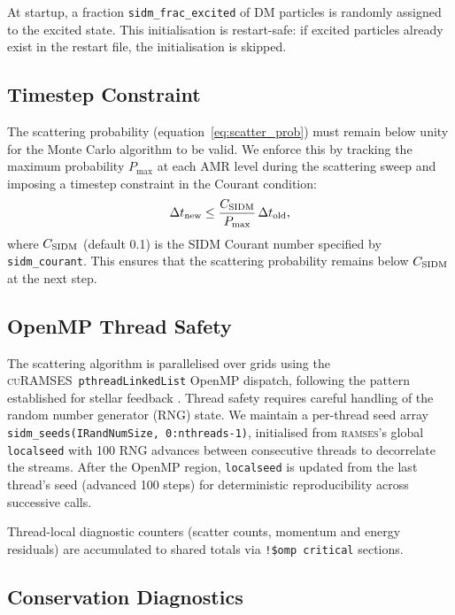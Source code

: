 \documentclass[fleqn,usenatbib]{mnras}
\newcommand{\ramses}{\textsc{ramses}}
\newcommand{\curamses}{\textsc{cuRAMSES}}
\newcommand{\code}[1]{\texttt{#1}}
\begin{document}
At startup, a fraction \code{sidm\_frac\_excited} of DM particles is
randomly assigned to the excited state.  This initialisation is
restart-safe: if excited particles already exist in the restart file,
the initialisation is skipped.

\subsection{Timestep Constraint}
\label{sec:sidm_timestep}

The scattering probability (equation~\ref{eq:scatter_prob}) must
remain below unity for the Monte Carlo algorithm to be valid.  We
enforce this by tracking the maximum probability $P_{\max}$ at each
AMR level during the scattering sweep and imposing a timestep
constraint in the Courant condition:
\begin{equation}
\Delta t_{\rm new} \le \frac{C_{\rm SIDM}}{P_{\max}}\,\Delta t_{\rm old},
\label{eq:sidm_dt}
\end{equation}
where $C_{\rm SIDM}$ (default 0.1) is the SIDM Courant number
specified by \code{sidm\_courant}.  This ensures that the scattering
probability remains below $C_{\rm SIDM}$ at the next step.

\subsection{OpenMP Thread Safety}
\label{sec:sidm_omp}

The scattering algorithm is parallelised over grids using the
\curamses\ \code{pthreadLinkedList} OpenMP dispatch, following the
pattern established for stellar feedback \citep{Kim2026}.  Thread
safety requires careful handling of the random number generator (RNG)
state.  We maintain a per-thread seed array
\code{sidm\_seeds(IRandNumSize, 0:nthreads-1)}, initialised from
\ramses's global \code{localseed} with 100 RNG advances between
consecutive threads to decorrelate the streams.  After the OpenMP
region, \code{localseed} is updated from the last thread's seed
(advanced 100 steps) for deterministic reproducibility across
successive calls.

Thread-local diagnostic counters (scatter counts, momentum and energy
residuals) are accumulated to shared totals via \code{!\$omp critical}
sections.

\subsection{Conservation Diagnostics}
\label{sec:sidm_conservation}
\end{document}
